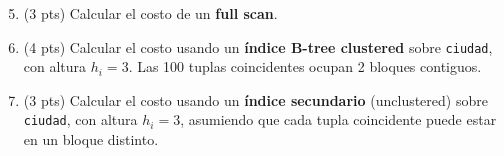 \documentclass[11pt,a4paper]{article}
\begin{document}
\begin{enumerate}
  \setcounter{enumi}{4}
  \item (3 pts) Calcular el costo de un \textbf{full scan}.

  \vspace{2.5cm}

  \item (4 pts) Calcular el costo usando un \textbf{índice B-tree clustered} sobre \texttt{ciudad}, con altura $h_i = 3$. Las 100 tuplas coincidentes ocupan 2 bloques contiguos.

  \vspace{2.5cm}

  \item (3 pts) Calcular el costo usando un \textbf{índice secundario} (unclustered) sobre \texttt{ciudad}, con altura $h_i = 3$, asumiendo que cada tupla coincidente puede estar en un bloque distinto.

  \vspace{2.5cm}
\end{enumerate}
\end{document}
